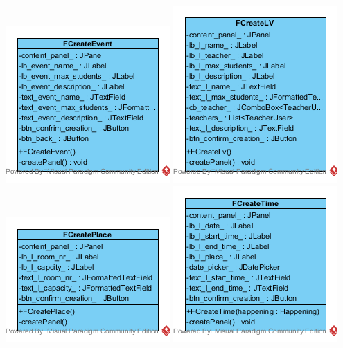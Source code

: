 \documentclass[a4paper,12pt]{article}
\begin{document}
\begin{center}
	\includegraphics[scale=1]{cFCreateEvent.png}
	\includegraphics[scale=1]{cFCreateLv.png}
	\includegraphics[scale=1]{cFCreatePlace.png}
	\includegraphics[scale=1]{cFCreateTime.png}

\end{center}
\end{document}

